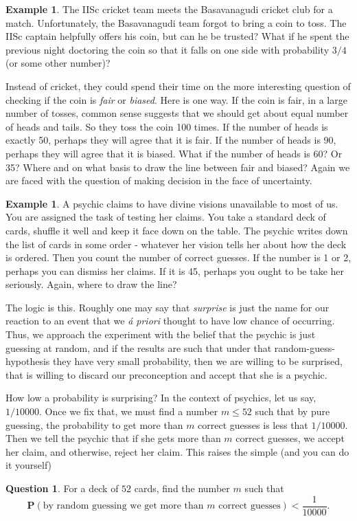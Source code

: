 \documentclass[preprint,  11pt]{amsart}
\theoremstyle{plain} %
\theoremstyle{definition} %
\newtheorem{question}[theorem]{Question}
\newtheorem{example}[theorem]{Example}
\begin{document}
\begin{example} The IISc cricket team meets the Basavanagudi cricket club for a match. Unfortunately, the Basavanagudi team forgot to bring a coin to toss. The IISc captain helpfully offers his coin, but can he be trusted? What if he spent the previous night doctoring the coin so that it falls on one side with probability $3/4$ (or some other number)? 

Instead of cricket, they could spend their time on the more interesting question of checking if the coin is {\em fair} or {\em biased}. Here is one way. If the coin is fair, in a large number of tosses, common sense suggests that we should get about equal number of heads and tails. So they  toss the coin 100 times. If the number of heads is exactly 50, perhaps they will agree that it is fair. If the number of heads is 90, perhaps they will agree that it is biased. What if the number of heads is 60? Or 35? Where and on what basis to draw the line between fair and biased? Again we are faced with the question of making decision in the face of uncertainty.
\end{example}

\begin{example} A psychic claims to have divine visions unavailable to most of us. You are assigned the task of testing her claims. You take a standard deck of cards, shuffle it well and keep it face down on the table. The psychic writes down the list of cards in some order - whatever her vision tells her about how the deck is ordered. Then you count the number of correct guesses. If the number is 1 or 2, perhaps you can dismiss her claims. If it is 45, perhaps you ought to be take her seriously. Again, where to draw the line? 

The logic is this. Roughly one may say that {\em surprise} is just the name for our reaction to an event that we {\em \'{a} priori} thought to have low chance of occurring. Thus, we approach the experiment with the belief that the psychic is just guessing at random, and if the results are such that under that random-guess-hypothesis they have very small probability, then we are willing to be surprised, that is willing to discard our preconception and accept that she is a psychic. 

How low a probability is surprising? In the context of psychics, let us say, $1/10000$. Once we fix that, we must find a number $m\le 52$ such that by pure guessing, the probability to get more than $m$ correct guesses is less that $1/10000$. Then we tell the psychic that if she gets more than $m$ correct guesses, we accept her claim, and otherwise, reject her claim.  This raises the simple (and you can do it yourself) 
\begin{question} For a deck of $52$ cards, find the number $m$ such that
$$
\mathbf{P}(\mbox{by random guessing we get more than }m\mbox{ correct guesses})<\frac{1}{10000}.
$$
\end{question}
\end{example}
\end{document}
